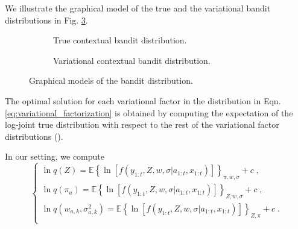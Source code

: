 \documentclass[10pt]{article}
\newcommand{\eValue}[1]{\mathbb{E}\left\{ #1 \right\}}
\begin{document}
We illustrate the graphical model of the true and the variational bandit distributions in Fig. \ref{fig:graphical_bandit}.

\begin{figure}[h]
	\centering
	\begin{subfigure}[b]{0.49\textwidth}
		\begin{center}
			
		\end{center}
		\label{fig:true_bandit}
		\caption{True contextual bandit distribution.}
	\end{subfigure}
	\begin{subfigure}[b]{0.49\textwidth}	
		\begin{center}
			
		\end{center}
		\label{fig:variational_bandit}
		\caption{Variational contextual bandit distribution.}
	\end{subfigure}
	\caption{Graphical models of the bandit distribution.}
	\label{fig:graphical_bandit}
\end{figure}

The optimal solution for each variational factor in the distribution in Eqn. \ref{eq:variational_factorization} is obtained by computing the expectation of the log-joint true distribution with respect to the rest of the variational factor distributions (\cite{b-Bishop2006}).

In our setting, we compute
\begin{equation}
\begin{cases}
\ln q(Z) =\eValue{\ln\left[f(y_{1:t}, Z, w, \sigma|a_{1:t}, x_{1:t})\right]}_{\pi, w, \sigma}+c \;, \\
\ln q(\pi_a) =\eValue{\ln\left[f(y_{1:t}, Z, w, \sigma|a_{1:t}, x_{1:t})\right]}_{Z, w, \sigma}+c \;,\\
\ln q(w_{a,k},\sigma_{a,k}^2) =\eValue{\ln\left[f(y_{1:t}, Z, w, \sigma|a_{1:t}, x_{1:t})\right]}_{Z,\pi}+c \;.\\
\end{cases}
\end{equation}
\end{document}
